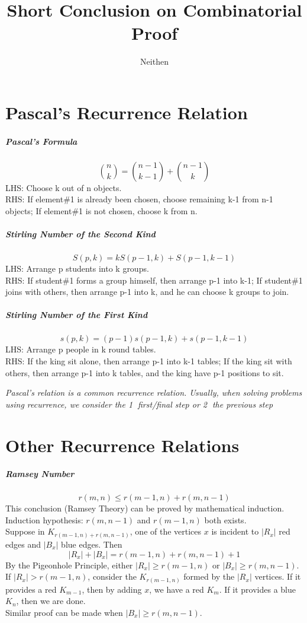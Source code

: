\documentclass{article}
\title{Short Conclusion on Combinatorial Proof}
\author{Neithen}
\begin{document}
	\maketitle
	
	\section{Pascal's Recurrence Relation}
	\subparagraph{Pascal's Formula}
	$${n \choose k} = {n-1 \choose k-1} + {n-1 \choose k}$$
	LHS: Choose k out of n objects.\\
	RHS: If element\#1 is already been chosen, choose remaining k-1 from n-1 objects; If element\#1 is not chosen, choose k from n.
	
	\subparagraph{Stirling Number of the Second Kind}
	$$S(p,k)=kS(p-1,k)+S(p-1,k-1)$$
	LHS: Arrange p students into k groups.\\
	RHS: If student\#1 forms a group himself, then arrange p-1 into k-1; If student\#1 joins with others, then arrange p-1 into k, and he can choose k groups to join.
	
	\subparagraph{Stirling Number of the First Kind}
	$$s(p,k)=(p-1)s(p-1,k)+s(p-1,k-1)$$
	LHS: Arrange p people in k round tables.\\
	RHS: If the king sit alone, then arrange p-1 into k-1 tables; If the king sit with others, then arrange p-1 into k tables, and the king have p-1 positions to sit.
	
	\textit{Pascal's relation is a common recurrence relation. Usually, when solving problems using recurrence, we consider the \textcircled{1} first/final step or \textcircled{2} the previous step}
	
	\section{Other Recurrence Relations}
	\subparagraph{Ramsey Number}
	$$r(m,n)\leq r(m-1,n)+r(m,n-1)$$
	This conclusion (Ramsey Theory) can be proved by mathematical induction.\\
	Induction hypothesis: $r(m,n-1)$ and $r(m-1,n)$ both exists.\\
	Suppose in $K_{r(m-1,n)+r(m,n-1)}$, one of the vertices $x$ is incident to $|R_x|$ red edges and $|B_x|$ blue edges. Then
	$$ |R_x|+|B_x|=r(m-1,n)+r(m,n-1)+1$$
	By the Pigeonhole Principle, either $|R_x|\geq r(m-1,n)$ or $|B_x| \geq r(m,n-1)$.\\
	If $|R_x|>r(m-1,n)$, consider the $K_{r(m-1,n)}$ formed by the $|R_x|$ vertices. If it provides a red $K_{m-1}$, then by adding $x$, we have a red $K_m$. If it provides a blue $K_n$, then we are done.\\
	Similar proof can be made when $|B_x| \geq r(m,n-1)$.\\
	
\end{document}
